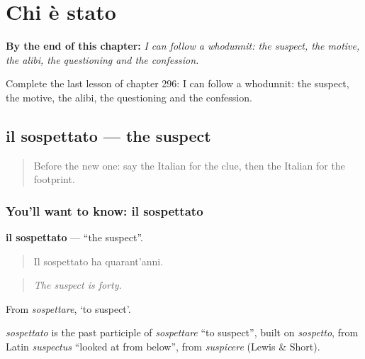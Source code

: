 
\chapter{Chi è stato}
\label{ch:it-chi-e-stato}

\begin{chapteropening}
\textbf{By the end of this chapter:} \emph{I can follow a whodunnit: the suspect, the motive, the alibi, the questioning and the confession.}

Complete the last lesson of chapter 296: I can follow a whodunnit: the suspect, the motive, the alibi, the questioning and the confession.
\end{chapteropening}

\section[il sospettato]{il sospettato — the suspect}

\label{lesson:IT-C296-sospettato}



\begin{quote}
Before the new one: say the Italian for the clue, then the Italian for the footprint.
\end{quote}

\subsection*{You'll want to know: il sospettato}
\textbf{il sospettato} — \textquotedblleft{}the suspect\textquotedblright{}.

\begin{quote}
Il sospettato ha quarant'anni.
\end{quote}

\begin{quote}
\emph{The suspect is forty.}
\end{quote}

From \emph{sospettare}, ‘to suspect’.

\begin{cousinweb}
\emph{sospettato} is the past participle of \emph{sospettare} \textquotedblleft{}to suspect\textquotedblright{}, built on \emph{sospetto}, from Latin \emph{suspectus} \textquotedblleft{}looked at from below\textquotedblright{}, from \emph{suspicere} (Lewis \& Short).
\end{cousinweb}

